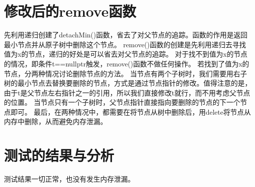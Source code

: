 \documentclass[UTF8]{ctexart}
\begin{document}
\pagestyle{fancy}
\fancyhead{}

\section{修改后的remove函数}

先利用递归创建了detachMin()函数，省去了对父节点的追踪。函数的作用是返回最小节点并从原子树中删除这个节点。
remove()函数的创建是先利用递归去寻找值为x的节点，递归的好处是可以省去对父节点的追踪。
对于找不到值为x的节点的情况，即条件t==nullptr触发，remove()函数不做任何操作。
若找到了值为x的节点，分两种情况讨论删除节点的方法。
当节点有两个子树时，我们需要用右子树的最小节点去替换要删除的节点，方式是通过节点指针的修改。值得注意的是，由于t是父节点左右指针之一的引用，所以我们直接修改t就行，而不用考虑父节点的位置。
当节点只有一个子树时，父节点指针直接指向要删除的节点的下一个节点即可。
最后，在两种情况中，都需要在将节点从树中删除后，用delete将节点从内存中删除，从而避免内存泄漏。

\section{测试的结果与分析}

测试结果一切正常，也没有发生内存泄漏。
\end{document}
